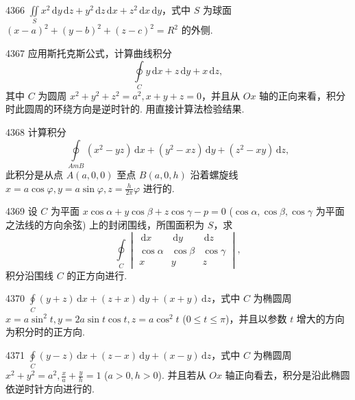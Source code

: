 \begin{prob}[S]{4366}
$\iint\limits_S x^2\,\mathrm{d}y\,\mathrm{d}z + y^2\,\mathrm{d}z\,\mathrm{d}x + z^2\,\mathrm{d}x\,\mathrm{d}y$，式中 $S$ 为球面 $(x - a)^2 + (y - b)^2 + (z - c)^2 = R^2$ 的外侧.
\end{prob}


\begin{prob}[M]{4367}
应用斯托克斯公式，计算曲线积分
\[
\oint\limits_C y\,\mathrm{d}x + z\,\mathrm{d}y + x\,\mathrm{d}z,
\]
其中 $C$ 为圆周 $x^2 + y^2 + z^2 = a^2, x + y + z = 0$，并且从 $Ox$ 轴的正向来看，积分时此圆周的环绕方向是逆时针的. 用直接计算法检验结果.
\end{prob}

\begin{prob}[M]{4368}
计算积分
\[
\oint\limits_{AmB} (x^2 - yz)\,\mathrm{d}x + (y^2 - xz)\,\mathrm{d}y + (z^2 - xy)\,\mathrm{d}z,
\]
此积分是从点 $A(a, 0, 0)$ 至点 $B(a, 0, h)$ 沿着螺旋线 $x = a\cos\varphi, y = a\sin\varphi, z = \frac{h}{2\pi}\varphi$ 进行的.
\end{prob}

\begin{prob}[M]{4369}
设 $C$ 为平面 $x\cos\alpha + y\cos\beta + z\cos\gamma - p = 0$ ($\cos\alpha, \cos\beta, \cos\gamma$ 为平面之法线的方向余弦) 上的封闭围线，所围面积为 $S$，求
\[
\oint\limits_C \begin{vmatrix} \,\mathrm{d}x & \,\mathrm{d}y & \,\mathrm{d}z \\ \cos\alpha & \cos\beta & \cos\gamma \\ x & y & z \end{vmatrix},
\]
积分沿围线 $C$ 的正方向进行.
\end{prob}


\begin{prob}[M]{4370}
$\oint\limits_C (y + z)\,\mathrm{d}x + (z + x)\,\mathrm{d}y + (x + y)\,\mathrm{d}z$，式中 $C$ 为椭圆周 $x = a\sin^2 t, y = 2a\sin t\cos t, z = a\cos^2 t$ ($0 \leqslant t \leqslant \pi$)，并且以参数 $t$ 增大的方向为积分时的正方向.
\end{prob}

\begin{prob}[M]{4371}
$\oint\limits_C (y - z)\,\mathrm{d}x + (z - x)\,\mathrm{d}y + (x - y)\,\mathrm{d}z$，式中 $C$ 为椭圆周 $x^2 + y^2 = a^2, \frac{x}{a} + \frac{y}{h} = 1$ ($a > 0, h > 0$). 并且若从 $Ox$ 轴正向看去，积分是沿此椭圆依逆时针方向进行的.
\end{prob}

